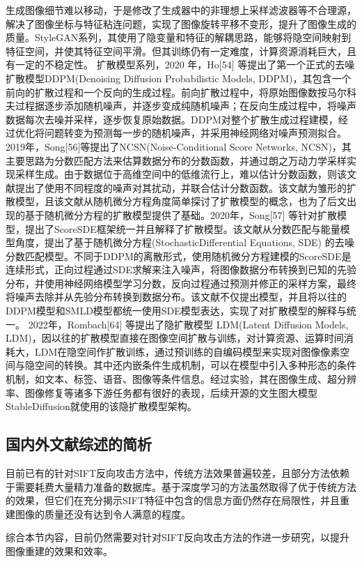 生成图像细节难以移动，于是修改了生成器中的非理想上采样滤波器等不合理源，解决了图像坐标与特征粘连问题，实现了图像旋转平移不变形，提升了图像生成的质量。StyleGAN系列，其使用了隐变量和特征的解耦思路，能够将隐空间映射到特征空间，并使其特征空间平滑。但其训练仍有一定难度，计算资源消耗巨大，且有一定的不稳定性。
扩散模型系列，2020 年，Ho[54] 等提出了第一个正式的去噪扩散模型DDPM(Denoising Diffusion Probabilistic Models, DDPM)，其包含一个前向的扩散过程和一个反向的生成过程。前向扩散过程中，将原始图像数按马尔科夫过程据逐步添加随机噪声，并逐步变成纯随机噪声；在反向生成过程中，将噪声数据每次去噪并采样，逐步恢复原始数据。DDPM对整个扩散生成过程建模，经过优化将问题转变为预测每一步的随机噪声，并采用神经网络对噪声预测拟合。
2019年，Song[56]等提出了NCSN(Noise-Conditional Score Networks, NCSN)，其主要思路为分数匹配方法来估算数据分布的分数函数，并通过朗之万动力学采样实现采样生成。由于数据位于高维空间中的低维流行上，难以估计分数函数，则该文献提出了使用不同程度的噪声对其扰动，并联合估计分数函数。该文献为雏形的扩散模型，且该文献从随机微分方程角度简单探讨了扩散模型的概念，也为了后文出现的基于随机微分方程的扩散模型提供了基础。2020年，Song[57] 等针对扩散模型，提出了ScoreSDE框架统一并且解释了扩散模型。该文献从分数匹配与能量模型角度，提出了基于随机微分方程(StochasticDifferential Equations, SDE) 的去噪分数匹配模型。不同于DDPM的离散形式，使用随机微分方程建模的ScoreSDE是连续形式，正向过程通过SDE求解来注入噪声，将图像数据分布转换到已知的先验分布，并使用神经网络模型学习分数，反向过程通过预测并修正的采样方案，最终将噪声去除并从先验分布转换到数据分布。该文献不仅提出模型，并且将以往的DDPM模型和SMLD模型都统一使用SDE模型表达，实现了对扩散模型的解释与统一。
2022年，Rombach[64] 等提出了隐扩散模型 LDM(Latent Diffusion Models, LDM)，因以往的扩散模型直接在图像空间扩散与训练，对计算资源、运算时间消耗大，LDM在隐空间作扩散训练，通过预训练的自编码模型来实现对图像像素空间与隐空间的转换。其中还内嵌条件生成机制，可以在模型中引入多种形态的条件机制，如文本、标签、语音、图像等条件信息。经过实验，其在图像生成、超分辨率、图像修复等诸多下游任务都有很好的表现，后续开源的文生图大模型StableDiffusion就使用的该隐扩散模型架构。
\subsection{国内外文献综述的简析}
目前已有的针对SIFT反向攻击方法中，传统方法效果普遍较差，且部分方法依赖于需要耗费大量精力准备的数据库。基于深度学习的方法虽然取得了优于传统方法的效果，但它们在充分揭示SIFT特征中包含的信息方面仍然存在局限性，并且重建图像的质量还没有达到令人满意的程度。
\par
综合本节内容，目前仍然需要对针对SIFT反向攻击方法的作进一步研究，以提升图像重建的效果和效率。
